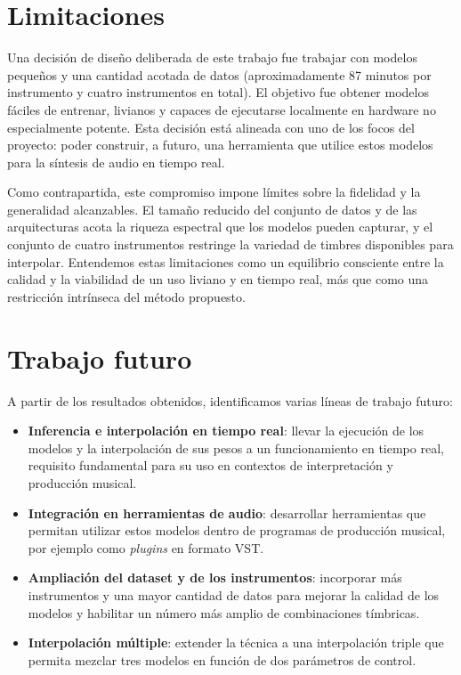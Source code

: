 \documentclass[12pt,a4paper,twoside]{tesis}
\begin{document}
\section{Limitaciones}

Una decisión de diseño deliberada de este trabajo fue trabajar con modelos pequeños y una cantidad acotada de datos (aproximadamente 87 minutos por instrumento y cuatro instrumentos en total). El objetivo fue obtener modelos fáciles de entrenar, livianos y capaces de ejecutarse localmente en hardware no especialmente potente. Esta decisión está alineada con uno de los focos del proyecto: poder construir, a futuro, una herramienta que utilice estos modelos para la síntesis de audio en tiempo real.

Como contrapartida, este compromiso impone límites sobre la fidelidad y la generalidad alcanzables. El tamaño reducido del conjunto de datos y de las arquitecturas acota la riqueza espectral que los modelos pueden capturar, y el conjunto de cuatro instrumentos restringe la variedad de timbres disponibles para interpolar. Entendemos estas limitaciones como un equilibrio consciente entre la calidad y la viabilidad de un uso liviano y en tiempo real, más que como una restricción intrínseca del método propuesto.

\section{Trabajo futuro}

A partir de los resultados obtenidos, identificamos varias líneas de trabajo futuro:

\begin{itemize}
    \item \textbf{Inferencia e interpolación en tiempo real}: llevar la ejecución de los modelos y la interpolación de sus pesos a un funcionamiento en tiempo real, requisito fundamental para su uso en contextos de interpretación y producción musical.
    \item \textbf{Integración en herramientas de audio}: desarrollar herramientas que permitan utilizar estos modelos dentro de programas de producción musical, por ejemplo como \textit{plugins} en formato VST.
    \item \textbf{Ampliación del dataset y de los instrumentos}: incorporar más instrumentos y una mayor cantidad de datos para mejorar la calidad de los modelos y habilitar un número más amplio de combinaciones tímbricas.
    \item \textbf{Interpolación múltiple}: extender la técnica a una interpolación triple que permita mezclar tres modelos en función de dos parámetros de control.
\end{itemize}


\backmatter


\end{document}
